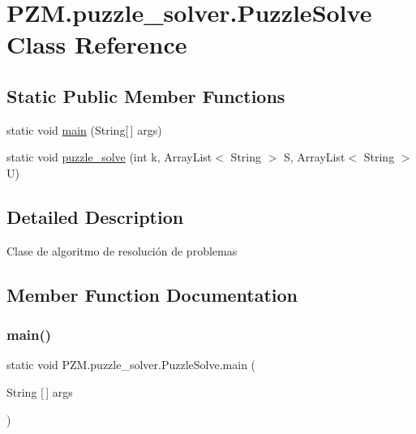 \hypertarget{class_p_z_m_1_1puzzle__solver_1_1_puzzle_solve}{}\section{P\+Z\+M.\+puzzle\+\_\+solver.\+Puzzle\+Solve Class Reference}
\label{class_p_z_m_1_1puzzle__solver_1_1_puzzle_solve}
\subsection*{Static Public Member Functions}
\begin{DoxyCompactItemize}
\item 
static void \hyperlink{class_p_z_m_1_1puzzle__solver_1_1_puzzle_solve_a23f2fa383e45e7dcbd484108f38bcea9}{main} (String\mbox{[}$\,$\mbox{]} args)
\item 
static void \hyperlink{class_p_z_m_1_1puzzle__solver_1_1_puzzle_solve_a0a5427627d50f43c830e3c6e8f858859}{puzzle\+\_\+solve} (int k, Array\+List$<$ String $>$ S, Array\+List$<$ String $>$ U)
\end{DoxyCompactItemize}


\subsection{Detailed Description}
Clase de algoritmo de resolución de problemas 

\subsection{Member Function Documentation}
\hypertarget{class_p_z_m_1_1puzzle__solver_1_1_puzzle_solve_a23f2fa383e45e7dcbd484108f38bcea9}{}\label{class_p_z_m_1_1puzzle__solver_1_1_puzzle_solve_a23f2fa383e45e7dcbd484108f38bcea9} 
\subsubsection{\texorpdfstring{main()}{main()}}
{\footnotesize\ttfamily static void P\+Z\+M.\+puzzle\+\_\+solver.\+Puzzle\+Solve.\+main (\begin{DoxyParamCaption}\item[{String \mbox{[}$\,$\mbox{]}}]{args }\end{DoxyParamCaption})\hspace{0.3cm}{\ttfamily [static]}}

